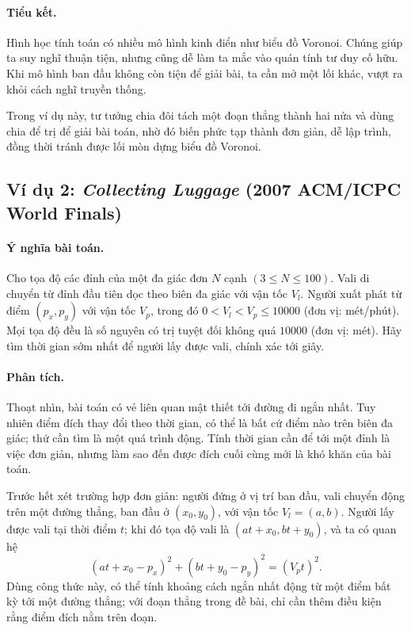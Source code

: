 \documentclass[11pt]{article}
\begin{document}
\paragraph{Tiểu kết.}
Hình học tính toán có nhiều mô hình kinh điển như biểu đồ Voronoi. Chúng giúp
ta suy nghĩ thuận tiện, nhưng cũng dễ làm ta mắc vào quán tính tư duy cố hữu.
Khi mô hình ban đầu không còn tiện để giải bài, ta cần mở một lối khác, vượt
ra khỏi cách nghĩ truyền thống.

Trong ví dụ này, tư tưởng chia đôi tách một đoạn thẳng thành hai nửa và dùng
chia để trị để giải bài toán, nhờ đó biến phức tạp thành đơn giản, dễ lập
trình, đồng thời tránh được lối mòn dựng biểu đồ Voronoi.

\subsection{Ví dụ 2: \textit{Collecting Luggage} (2007 ACM/ICPC World Finals)}

\paragraph{Ý nghĩa bài toán.}
Cho tọa độ các đỉnh của một đa giác đơn \(N\) cạnh \((3\le N\le 100)\). Vali
di chuyển từ đỉnh đầu tiên dọc theo biên đa giác với vận tốc \(V_l\). Người
xuất phát từ điểm \((p_x,p_y)\) với vận tốc \(V_p\), trong đó
\(0<V_l<V_p\le 10000\) (đơn vị: mét/phút). Mọi tọa độ đều là số nguyên có trị
tuyệt đối không quá \(10000\) (đơn vị: mét). Hãy tìm thời gian sớm nhất để
người lấy được vali, chính xác tới giây.

\paragraph{Phân tích.}
Thoạt nhìn, bài toán có vẻ liên quan mật thiết tới đường đi ngắn nhất. Tuy
nhiên điểm đích thay đổi theo thời gian, có thể là bất cứ điểm nào trên biên
đa giác; thứ cần tìm là một quá trình động. Tính thời gian cần để tới một đỉnh
là việc đơn giản, nhưng làm sao đến được đích cuối cùng mới là khó khăn của
bài toán.

Trước hết xét trường hợp đơn giản: người đứng ở vị trí ban đầu, vali chuyển
động trên một đường thẳng, ban đầu ở \((x_0,y_0)\), với vận tốc
\(V_l=(a,b)\). Người lấy được vali tại thời điểm \(t\); khi đó tọa độ vali là
\((at+x_0,bt+y_0)\), và ta có quan hệ
\[
  (at+x_0-p_x)^2+(bt+y_0-p_y)^2=(V_p t)^2.
\]
Dùng công thức này, có thể tính khoảng cách ngắn nhất động từ một điểm bất kỳ
tới một đường thẳng; với đoạn thẳng trong đề bài, chỉ cần thêm điều kiện rằng
điểm đích nằm trên đoạn.
\end{document}
